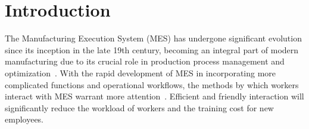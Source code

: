 \documentclass[preprint,12pt]{elsarticle}
\begin{document}


\section{Introduction}

The Manufacturing Execution System (MES) has undergone significant evolution since its inception in the late 19th century, becoming an integral part of modern manufacturing due to its crucial role in production process management and optimization~\cite{doi:10.1080/09537280902938613}. 
With the rapid development of MES in incorporating more complicated functions and operational workflows, the methods by which workers interact with MES warrant more attention~\cite{9781176}. 
Efficient and friendly interaction will significantly reduce the workload of workers and the training cost for new employees.

\end{document}

